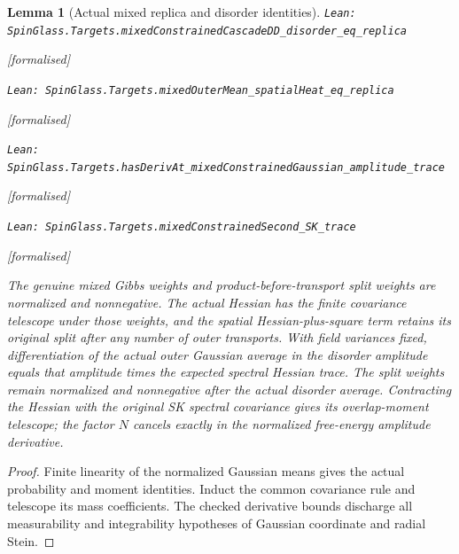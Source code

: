 \documentclass[11pt]{article}
\providecommand{\lean}[1]{\leavevmode\par\nopagebreak
  {\noindent\normalfont\footnotesize\raggedright\texttt{Lean: #1}\par}\nopagebreak}
\providecommand{\leanok}{\par\nopagebreak
  {\noindent\normalfont\footnotesize\textcolor{green!50!black}{[formalised]}\par}\nopagebreak}
\newtheorem{lemma}[theorem]{Lemma}
\begin{document}
\begin{lemma}[Actual mixed replica and disorder identities]
\lean{SpinGlass.Targets.mixedConstrainedCascadeDD\_disorder\_eq\_replica}\leanok
\lean{SpinGlass.Targets.mixedOuterMean\_spatialHeat\_eq\_replica}\leanok
\lean{SpinGlass.Targets.hasDerivAt\_mixedConstrainedGaussian\_amplitude\_trace}\leanok
\lean{SpinGlass.Targets.mixedConstrainedSecond\_SK\_trace}\leanok
The genuine mixed Gibbs weights and product-before-transport split weights
are normalized and nonnegative. The actual Hessian has the finite covariance
telescope under those weights, and the spatial Hessian-plus-square term
retains its original split after any number of outer transports. With field
variances fixed, differentiation of the actual outer Gaussian average in the
disorder amplitude equals that amplitude times the expected spectral Hessian
trace.
The split weights remain normalized and nonnegative after the actual disorder
average. Contracting the Hessian with the original SK spectral covariance
gives its overlap-moment telescope; the factor $N$ cancels exactly in the
normalized free-energy amplitude derivative.
\end{lemma}
\begin{proof}
Finite linearity of the normalized Gaussian means gives the actual probability
and moment identities. Induct the common covariance rule and telescope its
mass coefficients. The checked derivative bounds discharge all measurability
and integrability hypotheses of Gaussian coordinate and radial Stein.
\end{proof}
\end{document}

